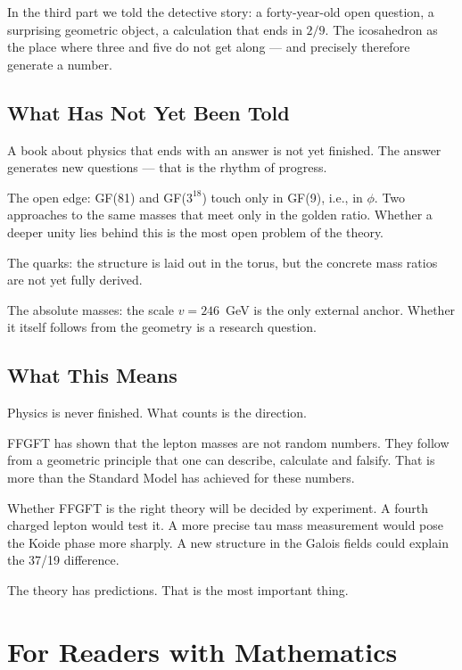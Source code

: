 \documentclass[12pt,oneside]{book}
\begin{document}
In the third part we told the detective story: a forty-year-old open question, a surprising geometric object, a calculation that ends in $2/9$. The icosa\-hedron as the place where three and five do not get along --- and precisely therefore generate a number.

\section{What Has Not Yet Been Told}

A book about physics that ends with an answer is not yet finished. The answer generates new questions --- that is the rhythm of progress.

The open edge: GF(81) and GF($3^{18}$) touch only in GF(9), i.e., in $\phi$. Two approaches to the same masses that meet only in the golden ratio. Whether a deeper unity lies behind this is the most open problem of the theory.

The quarks: the structure is laid out in the torus, but the concrete mass ratios are not yet fully derived.

The absolute masses: the scale $v = 246$~GeV is the only external anchor. Whether it itself follows from the geometry is a research question.

\section{What This Means}

Physics is never finished. What counts is the direction.

FFGFT has shown that the lepton masses are not random numbers. They follow from a geometric principle that one can describe, calculate and falsify. That is more than the Standard Model has achieved for these numbers.

Whether FFGFT is the right theory will be decided by experiment. A fourth charged lepton would test it. A more precise tau mass measurement would pose the Koide phase more sharply. A new structure in the Galois fields could explain the 37/19 difference.

The theory has predictions. That is the most important thing.

\appendix
\chapter{For Readers with Mathematics}
\end{document}
